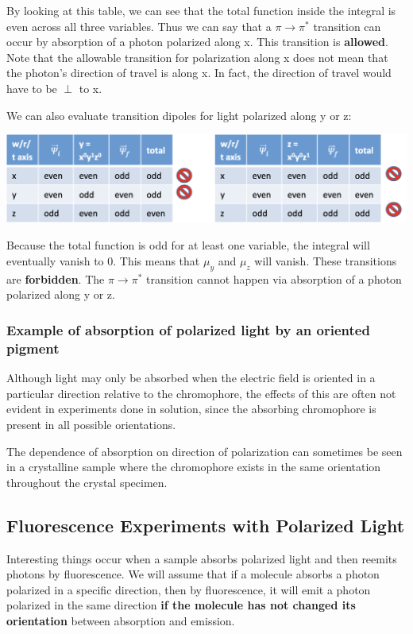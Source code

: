 \documentclass[12pt, letterpaper]{article}
\begin{document}
By looking at this table, we can see that the total function inside the integral is even across all three variables. 
Thus we can say that a \( \pi \rightarrow \pi^* \) transition can occur by absorption of a photon polarized along x. 
This transition is \textbf{allowed}. Note that the allowable transition for polarization along x does not mean that the photon's 
direction of travel is along x. In fact, the direction of travel would have to be $\perp $ to x. 

We can also evaluate transition dipoles for light polarized along y or z: 

\begin{center}
    \includegraphics[scale = 0.5]{more wavefunctions.png}
\end{center}

Because the total function is odd for at least one variable, the integral will eventually vanish to 0. This means that 
$\mu_y$ and $\mu_z$ will vanish. These transitions are \textbf{forbidden}. The \( \pi \rightarrow \pi^* \) transition cannot 
happen via absorption of a photon polarized along y or z. 

\subsubsection*{Example of absorption of polarized light by an oriented pigment}

Although light may only be absorbed when the electric field is oriented in a particular direction relative to the chromophore, 
the effects of this are often not evident in experiments done in solution, since the absorbing chromophore is present in all possible 
orientations. 

The dependence of absorption on direction of polarization can sometimes be seen in a crystalline sample 
where the chromophore exists in the same orientation throughout the crystal specimen. 

\subsection*{Fluorescence Experiments with Polarized Light}
Interesting things occur when a sample absorbs polarized light and then reemits photons by fluorescence.
We will assume that if a molecule absorbs a photon polarized in a specific direction, then by fluorescence, it will
emit a photon polarized in the same direction \textbf{if the molecule has not changed its orientation} between absorption and emission. 
\end{document}
